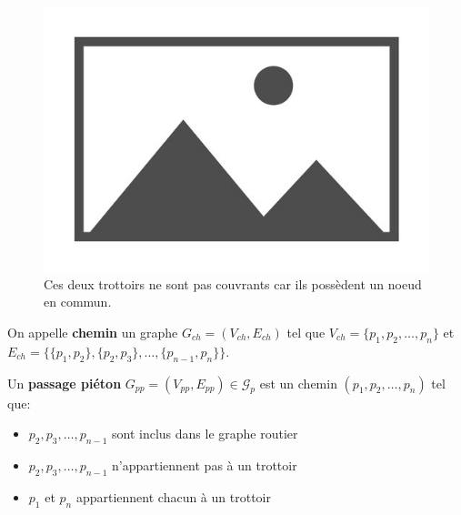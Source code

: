 \begin{figure}
    \centering
    \includegraphics{images/placeholder.jpg}
    \caption{Ces deux trottoirs ne sont pas couvrants car ils possèdent un noeud en commun.}
    \label{fig:mod_ex_trottoirs_couvrants}
\end{figure}

\begin{definition}
    On appelle \textbf{chemin} un graphe $G_{ch} = (V_{ch}, E_{ch})$ tel que $V_{ch}=\{p_1,p_2,\dots,p_n\}$ et $E_{ch}=\{\{p_1,p_2\},\{p_2,p_3\},\dots,\{p_{n-1},p_n\}\}$.
\end{definition}

\begin{definition}
    Un \textbf{passage piéton} $G_{pp} = (V_{pp}, E_{pp}) \in \mathcal{G}_p$ est un chemin $(p_1, p_2,\dots, p_n)$ tel que:

    \begin{itemize}
        \item $p_2, p_3, \dots, p_{n-1}$ sont inclus dans le graphe routier
        \item $p_2, p_3, \dots, p_{n-1}$ n'appartiennent pas à un trottoir
        \item $p_1$ et $p_n$ appartiennent chacun à un trottoir
    \end{itemize}
\end{definition}

